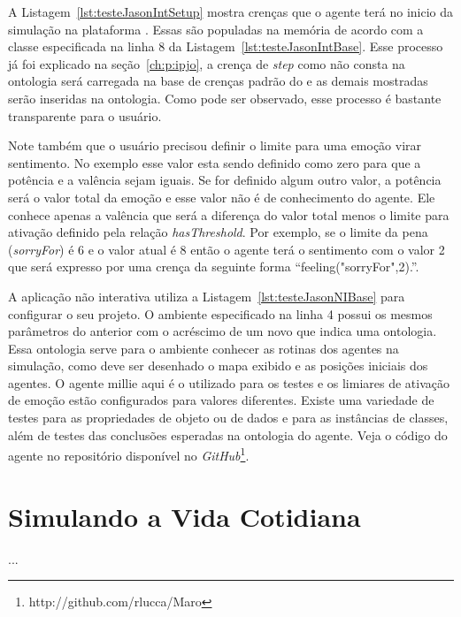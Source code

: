 A Listagem~\ref{lst:testeJasonIntSetup} mostra crenças que o agente terá
no inicio da simulação na plataforma \jason. Essas são populadas na memória
de acordo com a classe especificada na linha 8 da
Listagem~\ref{lst:testeJasonIntBase}. Esse processo já foi explicado na
seção~\ref{ch:p:ipjo}, a crença de \emph{step} como não
consta na ontologia será carregada na base de crenças padrão do \jason e as
demais mostradas serão inseridas na ontologia. Como pode ser observado, esse
processo é bastante transparente para o usuário.

Note também que o usuário precisou definir o limite para uma emoção virar
sentimento. No exemplo esse valor esta sendo definido como zero para que a
potência e a valência sejam iguais. Se for definido algum outro valor, a
potência será o valor total da emoção e esse valor não é de conhecimento do
agente. Ele conhece apenas a valência que será a diferença do valor total
menos o limite para ativação definido pela relação \emph{hasThreshold}. Por
exemplo, se o limite da pena (\emph{sorryFor}) é 6 e o valor atual é 8 então o
agente terá o sentimento com o valor 2 que será expresso por uma crença da
seguinte forma ``feeling("sorryFor",2).''.


\begin{center}
    \begin{minipage}{140mm}
	\lstset{linewidth=140mm}
	
    \end{minipage}
\end{center}

A aplicação não interativa utiliza a Listagem~\ref{lst:testeJasonNIBase} para
configurar o seu projeto. O ambiente especificado na linha 4 possui os mesmos
parâmetros do anterior com o acréscimo de um novo que indica uma ontologia.
Essa ontologia serve para o ambiente conhecer as rotinas dos agentes na
simulação, como deve ser desenhado o mapa exibido e as posições iniciais dos
agentes. O agente millie aqui é o utilizado para os testes e os limiares de
ativação de emoção estão configurados para valores diferentes. Existe uma
variedade de testes para as propriedades de objeto ou de dados e para as
instâncias de classes, além de testes das conclusões esperadas na ontologia do
agente. Veja o código do agente no repositório disponível no
\emph{GitHub}\footnote{http://github.com/rlucca/Maro}.

\section{Simulando a Vida Cotidiana} \label{ch:cdu:svc}

...


